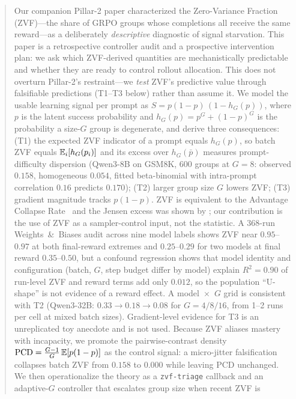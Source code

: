 \begin{abstract}
Our companion Pillar-2 paper characterized the Zero-Variance Fraction
(ZVF)---the share of GRPO groups whose completions all receive the same
reward---as a deliberately \emph{descriptive} diagnostic of signal starvation.
This paper is a retrospective controller audit and a prospective intervention
plan: we ask which ZVF-derived quantities are mechanistically predictable and
whether they are ready to control rollout allocation. This does not
overturn Pillar-2's restraint---we \emph{test} ZVF's predictive value through
falsifiable predictions (T1--T3 below) rather than assume it. We model the
usable learning signal per prompt as $S = p(1-p)\,(1 - h_G(p))$, where $p$ is
the latent success probability and $h_G(p) = p^G + (1-p)^G$ is the probability
a size-$G$ group is degenerate, and derive three consequences:
(T1) the expected ZVF indicator of a prompt equals $h_G(p)$, so batch ZVF
equals $\E_i[h_G(p_i)]$ and its excess over $h_G(\bar p)$ measures
prompt-difficulty dispersion (Qwen3-8B on GSM8K, 600 groups at $G{=}8$: observed
$0.158$, homogeneous $0.054$, fitted beta-binomial with intra-prompt correlation
$0.16$ predicts $0.170$);
(T2) larger group size $G$ lowers ZVF; (T3) gradient magnitude tracks $p(1-p)$.
ZVF is equivalent to the Advantage Collapse Rate~\citep{he2026advantage} and
the Jensen excess was shown by \citet{nie2026gradstarvation}; our contribution
is the use of ZVF as a sampler-control input, not the statistic.
A 368-run Weights~\&~Biases audit across nine model labels shows ZVF near
$0.95$--$0.97$ at both final-reward extremes and $0.25$--$0.29$ for two models
at final reward $0.35$--$0.50$, but a confound regression shows that model
identity and configuration (batch, $G$, step budget differ by model) explain
$R^2=0.90$ of run-level ZVF and reward terms add only $0.012$, so the
population ``U-shape'' is not evidence of a reward effect. A model~$\times$~$G$
grid is consistent with T2 (Qwen3-32B: $0.33 \to 0.18 \to 0.08$ for
$G = 4/8/16$, from 1--2 runs per cell at mixed batch sizes). Gradient-level
evidence for T3 is an unreplicated toy anecdote and is not used. Because ZVF
aliases mastery with incapacity, we promote the pairwise-contrast density
$\mathrm{PCD} = \frac{G-1}{G}\,\E[p(1-p)]$ as the control signal: a micro-jitter
falsification collapses batch ZVF from $0.158$ to $0.000$ while leaving PCD
unchanged. We then operationalize the theory as a \texttt{zvf-triage} callback
and an adaptive-$G$ controller that escalates group size when recent ZVF is

\end{abstract}
